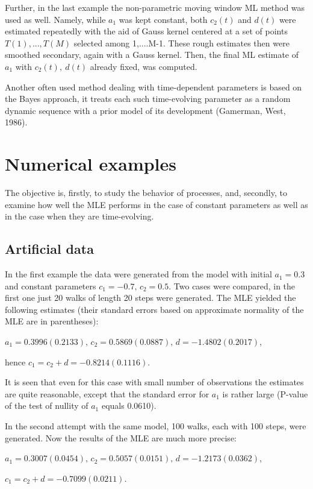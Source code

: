 \documentclass[11pt]{article}
\begin{document}
Further, in the last example the non-parametric moving window ML method was used as well.
Namely, while $a_1$ was kept constant, both $c_2(t)$ and $d(t)$ were estimated repeatedly
with the aid of Gauss kernel centered  at a set of points $T(1),...,T(M)$ selected among 1,....M-1.
These rough estimates then were smoothed secondary, again with a Gauss kernel. Then, the final
ML estimate of $a_1$ with $c_2(t),\ d(t)$ already fixed, was computed.

Another often used method dealing with time-dependent parameters
is based on the Bayes approach, it treats each such time-evolving
parameter as a random dynamic sequence with a prior model of its
development (Gamerman, West, 1986).

\section{Numerical examples}

The objective is, firstly, to study the behavior of processes, and,
secondly, to examine how well the MLE performs in the case of
constant parameters as well as in the case when they are
time-evolving.

\subsection{Artificial data}

In the first example the data were generated from the model with
initial $a_1=0.3$ and constant parameters $c_1=-0.7,\,c_2=0.5$.
Two cases were compared, in the first one just 20 walks of length
20 steps were generated. The MLE yielded the following estimates
(their standard errors based on approximate normality of the MLE are in
parentheses):

$a_1=0.3996 (0.2133),\,c_2=0.5869 (0.0887),\, d=-1.4802 (0.2017)$,

hence $c_1=c_2+d= -0.8214 (0.1116).$

It is seen that even for this case with small number of
observations the estimates are quite reasonable, except that the
standard error for $a_1$ is rather large (P-value of the test of
nullity of $a_1$ equals 0.0610).

In the second attempt with the same model, 100 walks, each with
100 steps, were generated. Now the results of the MLE are much
more precise:

$a_1=0.3007 (0.0454),\,c_2=0.5057 (0.0151),\, d=-1.2173 (0.0362)$,

 $c_1=c_2+d= -0.7099 (0.0211).$
\end{document}
